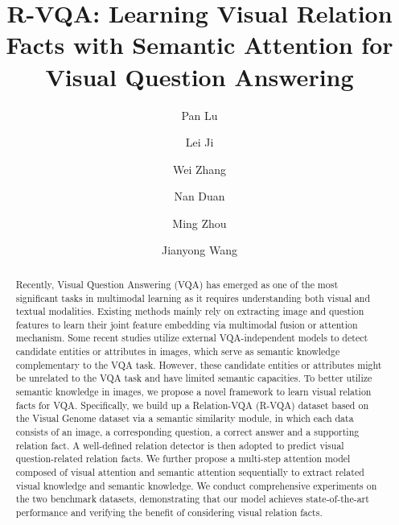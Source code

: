 \documentclass[sigconf]{acmart}
\begin{document}
\title{R-VQA: Learning Visual Relation Facts with Semantic Attention for Visual Question Answering}


\author{Pan Lu}

\author{Lei Ji}

\author{Wei Zhang}

\author{Nan Duan}

\author{Ming Zhou}

\author{Jianyong Wang}

\renewcommand{\shortauthors}{P. Lu et al.}


\begin{abstract}

Recently, Visual Question Answering (VQA) has emerged as one of the most significant tasks in multimodal learning as it requires understanding both visual and textual modalities. Existing methods mainly rely on extracting image and question features to learn their joint feature embedding via multimodal fusion or attention mechanism. Some recent studies utilize external VQA-independent models to detect candidate entities or attributes in images, which serve as semantic knowledge complementary to the VQA task. However, these candidate entities or attributes might be unrelated to the VQA task and have limited semantic capacities. To better utilize semantic knowledge in images, we propose a novel framework to learn visual relation facts for VQA. Specifically, we build up a Relation-VQA (R-VQA) dataset based on the Visual Genome dataset via a semantic similarity module, in which each data consists of an image, a corresponding question, a correct answer and a supporting relation fact. A well-defined relation detector is then adopted to predict visual question-related relation facts. We further propose a multi-step attention model composed of visual attention and semantic attention sequentially to extract related visual knowledge and semantic knowledge. We conduct comprehensive experiments on the two benchmark datasets, demonstrating that our model achieves state-of-the-art performance and verifying the benefit of considering visual relation facts.




\end{abstract}
\end{document}
